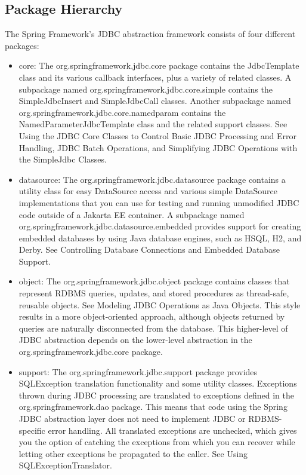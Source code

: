 \documentclass{scrartcl}
\begin{document}
\subsection{Package Hierarchy}

The Spring Framework’s JDBC abstraction framework consists of four different packages:

\begin{itemize}
    \item core: The org.springframework.jdbc.core package contains the JdbcTemplate class and its various callback interfaces, plus a variety of related classes. A subpackage named org.springframework.jdbc.core.simple contains the SimpleJdbcInsert and SimpleJdbcCall classes. Another subpackage named org.springframework.jdbc.core.namedparam contains the NamedParameterJdbcTemplate class and the related support classes. See Using the JDBC Core Classes to Control Basic JDBC Processing and Error Handling, JDBC Batch Operations, and Simplifying JDBC Operations with the SimpleJdbc Classes.

    \item datasource: The org.springframework.jdbc.datasource package contains a utility class for easy DataSource access and various simple DataSource implementations that you can use for testing and running unmodified JDBC code outside of a Jakarta EE container. A subpackage named org.springframework.jdbc.datasource.embedded provides support for creating embedded databases by using Java database engines, such as HSQL, H2, and Derby. See Controlling Database Connections and Embedded Database Support.

    \item object: The org.springframework.jdbc.object package contains classes that represent RDBMS queries, updates, and stored procedures as thread-safe, reusable objects. See Modeling JDBC Operations as Java Objects. This style results in a more object-oriented approach, although objects returned by queries are naturally disconnected from the database. This higher-level of JDBC abstraction depends on the lower-level abstraction in the org.springframework.jdbc.core package.

    \item support: The org.springframework.jdbc.support package provides SQLException translation functionality and some utility classes. Exceptions thrown during JDBC processing are translated to exceptions defined in the org.springframework.dao package. This means that code using the Spring JDBC abstraction layer does not need to implement JDBC or RDBMS-specific error handling. All translated exceptions are unchecked, which gives you the option of catching the exceptions from which you can recover while letting other exceptions be propagated to the caller. See Using SQLExceptionTranslator.
\end{itemize}
\end{document}
